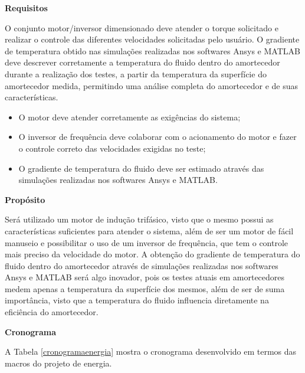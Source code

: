 	\textbf{Requisitos}

	O conjunto motor/inversor dimensionado deve atender o torque solicitado e realizar o controle das diferentes velocidades solicitadas pelo usuário. O gradiente de temperatura obtido nas simulações realizadas nos softwares Ansys e MATLAB deve descrever corretamente a temperatura do fluido dentro do amortecedor durante a realização dos testes, a partir da temperatura da superfície do amortecedor medida, permitindo uma análise completa do amortecedor e de suas características.

	\begin{itemize}
		\item O motor deve atender corretamente as exigências do sistema;
		\item O inversor de frequência deve colaborar com o acionamento do motor e fazer o controle correto das velocidades exigidas no teste;
		\item  O gradiente de temperatura do fluido deve ser estimado através das simulações realizadas nos softwares Ansys e MATLAB.
	\end{itemize}

	\textbf{Propósito}

	Será utilizado um motor de indução trifásico, visto que o mesmo possui as características suficientes para atender o sistema, além de ser um motor de fácil manuseio e possibilitar o uso de um inversor de frequência, que tem o controle mais preciso da velocidade do motor. A obtenção do gradiente de temperatura do fluido dentro do amortecedor através de simulações realizadas nos softwares Ansys e MATLAB será algo inovador, pois os testes atuais em amortecedores medem apenas a temperatura da superfície dos mesmos, além de ser de suma importância, visto que a temperatura do fluido influencia diretamente na eficiência do amortecedor.

	\textbf{Cronograma}

	A Tabela \ref{cronogramaenergia} mostra o cronograma desenvolvido em termos das macros do projeto de energia.

